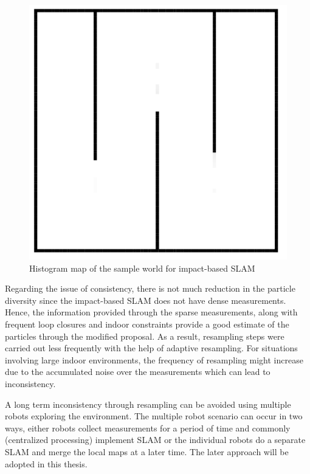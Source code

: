 \begin{figure}
\centering
\includegraphics[scale=0.3]{./images/hist_map}
\caption[Output histogram map of the simulated environment]{Histogram map of the sample world for impact-based SLAM}
\label{hist_map}
\end{figure}

Regarding the issue of consistency, there is not much reduction in the particle diversity since the impact-based SLAM does not have dense measurements. Hence, the information provided through the sparse measurements, along with frequent loop closures and indoor constraints provide a good estimate of the particles through the modified proposal. As a result, resampling steps were carried out less frequently with the help of adaptive resampling. For situations involving large indoor environments, the frequency of resampling might increase due to the accumulated noise over the measurements which can lead to inconsistency.

A long term inconsistency through resampling can be avoided using multiple robots exploring the environment. The multiple robot scenario can occur in two ways, either robots collect measurements for a period of time and commonly (centralized processing) implement SLAM or the individual robots do a separate SLAM and merge the local maps at a later time. The later approach will be adopted in this thesis.

